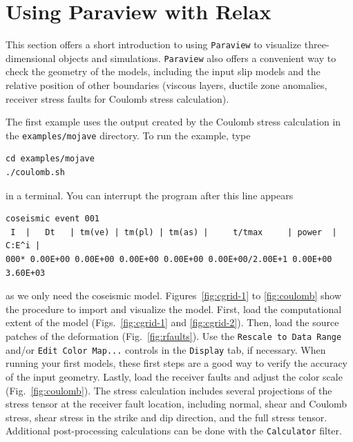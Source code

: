 \documentclass[10pt]{article}
\begin{document}
\pagebreak
\section{Using Paraview with Relax}

This section offers a short introduction to using \verb`Paraview` to visualize three-dimensional objects and simulations. \verb`Paraview` also offers a convenient way to check the geometry of the models, including the input slip models and the relative position of other boundaries (viscous layers, ductile zone anomalies, receiver stress faults for Coulomb stress calculation). 

The first example uses the output created by the Coulomb stress calculation in the \verb`examples/mojave` directory. To run the example, type
\begin{verbatim}
cd examples/mojave
./coulomb.sh
\end{verbatim}
in a terminal. You can interrupt the program after this line appears
\begin{verbatim}
coseismic event 001
 I  |   Dt   | tm(ve) | tm(pl) | tm(as) |     t/tmax     | power  |  C:E^i |
000* 0.00E+00 0.00E+00 0.00E+00 0.00E+00 0.00E+00/2.00E+1 0.00E+00 3.60E+03
\end{verbatim}
as we only need the coseismic model. Figures~\ref{fig:cgrid-1} to \ref{fig:coulomb} show the procedure to import and visualize the model. First, load the computational extent of the model (Figs.~\ref{fig:cgrid-1} and \ref{fig:cgrid-2}). Then, load the source patches of the deformation (Fig.~\ref{fig:rfaults}). Use the \verb`Rescale to Data Range` and/or \verb`Edit Color Map...` controls in the \verb`Display` tab, if necessary. When running your first models, these first steps are a good way to verify the accuracy of the input geometry. Lastly, load the receiver faults and adjust the color scale (Fig.~\ref{fig:coulomb}). The stress calculation includes several projections of the stress tensor at the receiver fault location, including normal, shear and Coulomb stress, shear stress in the strike and dip direction, and the full stress tensor. Additional post-processing calculations can be done with the \verb`Calculator` filter.
\end{document}
